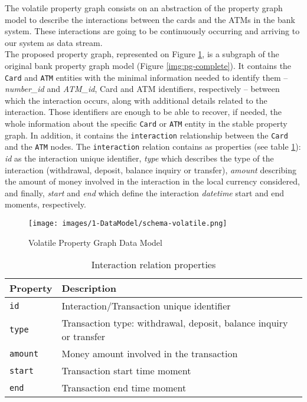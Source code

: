 The volatile property graph consists on an abstraction of the property graph model to describe the interactions between the cards and the ATMs in the bank system. These interactions are going to be continuously occurring and arriving to our system as data stream.\\

The proposed property graph, represented on Figure \ref{img:pg-volatile}, is a subgraph of the original bank property graph model (Figure \ref{img:pg-complete}). It contains the \texttt{Card} and \texttt{ATM} entities with the minimal information needed to identify them -- \emph{number\_id} and \emph{ATM\_id}, Card and ATM identifiers, respectively -- between which the interaction occurs, along with additional details related to the interaction. Those identifiers are enough to be able to recover, if needed, the whole information about the specific \texttt{Card} or \texttt{ATM} entity in the stable property graph. In addition, it contains the \texttt{interaction} relationship between the \texttt{Card} and the \texttt{ATM} nodes. The \texttt{interaction} relation contains as properties (see table \ref{table:interaction-relation-properties}): \emph{id} as the interaction unique identifier, \emph{type} which describes the type of the interaction (withdrawal, deposit, balance inquiry or transfer), \emph{amount} describing the amount of money involved in the interaction in the local currency considered, and finally, \emph{start} and \emph{end} which define the interaction \emph{datetime} start and end moments, respectively. 

\begin{figure}[h]
    \centering
    \texttt{[image: images/1-DataModel/schema-volatile.png]}
    \caption{Volatile Property Graph Data Model}
    \label{img:pg-volatile}
\end{figure}

\begin{table}[H]
    \centering
    \begin{tabular}{|l|l|}
    \hline
    \textbf{Property}        & \textbf{Description}                                      \\ \hline
    \texttt{id}      & Interaction/Transaction unique identifier                             \\ \hline
    \texttt{type}  & Transaction type: withdrawal, deposit, balance inquiry or transfer           \\ \hline
    \texttt{amount} & Money amount involved in the transaction          \\ \hline
    \texttt{start}         & Transaction start time moment                         \\ \hline
    \texttt{end}      & Transaction end time moment                     \\ \hline
    \end{tabular}
    \caption{Interaction relation properties}
    \label{table:interaction-relation-properties}
\end{table}

